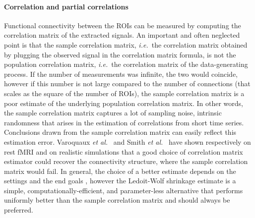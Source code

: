 \documentclass[5p]{elsarticle}
\begin{document}


\paragraph{Correlation and partial correlations}
%
Functional connectivity between the ROIs can be measured by computing the
correlation matrix of the extracted signals. An important and often
neglected point is that the sample correlation matrix, \emph{i.e.}\ the
correlation matrix obtained by plugging the observed signal in the
correlation matrix formula, is not the population correlation matrix,
\emph{i.e.}\ the correlation matrix of the data-generating process. If the
number of measurements was infinite, the two would coincide, however if
this number is not large compared to the number of connections (that
scales as the square of the number of ROIs), the sample correlation
matrix is a poor estimate of the underlying population correlation
matrix. In other words, the sample correlation matrix captures a lot of
sampling noise, intrinsic randomness that arises in the estimation of
correlations from short time series. Conclusions drawn from the sample
correlation matrix can easily reflect this estimation error.
%
Varoquaux \emph{et al.}~\cite{varoquaux2010c} and Smith \emph{et
al.}~\cite{smith2011} have shown respectively on rest fMRI and on
realistic simulations that a good choice of correlation matrix estimator
could recover the connectivity structure, where the sample correlation
matrix would fail. In general, the choice of a better estimate depends on
the settings and the end goals \cite{varoquaux2012,varoquaux2010b},
however the Ledoit-Wolf shrinkage estimate \cite{ledoit2004} is a simple,
computationally-efficient, and parameter-less alternative that performs
uniformly better than the sample correlation matrix
\cite{varoquaux2012,varoquaux2010c} and should always be preferred.
\end{document}
